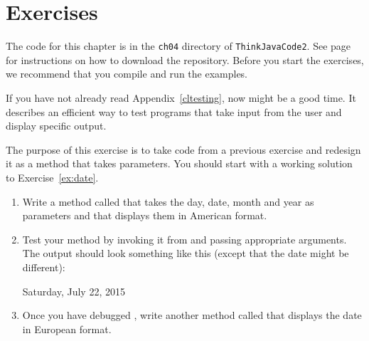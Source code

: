 \section{Exercises}

The code for this chapter is in the {\tt ch04} directory of {\tt ThinkJavaCode2}.
See page~\pageref{code} for instructions on how to download the repository.
Before you start the exercises, we recommend that you compile and run the examples.

If you have not already read Appendix~\ref{cltesting}, now might be a good time.
It describes an efficient way to test programs that take input from the user and display specific output.


\begin{exercise}  %

The purpose of this exercise is to take code from a previous exercise and redesign it as a method that takes parameters.
You should start with a working solution to Exercise~\ref{ex:date}.

\vspace{-1em}
\begin{enumerate}

\item Write a method called  that takes the day, date, month and year as parameters and that displays them in American format.

\item Test your method by invoking it from  and passing appropriate arguments.
The output should look something like this (except that the date might be different):

\begin{stdout}
Saturday, July 22, 2015
\end{stdout}

\item Once you have debugged , write another method called  that displays the date in European format.

\end{enumerate}
\vspace{1ex}

\end{exercise}


